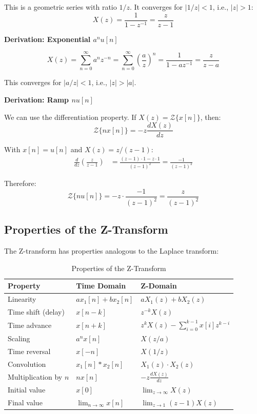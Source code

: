 This is a geometric series with ratio $1/z$. It converges for $|1/z| < 1$, i.e., $|z| > 1$:
\begin{equation}
X(z) = \frac{1}{1 - z^{-1}} = \frac{z}{z-1}
\end{equation}

\textbf{Derivation: Exponential $a^n u[n]$}

\begin{equation}
X(z) = \sum_{n=0}^{\infty} a^n z^{-n} = \sum_{n=0}^{\infty} \left(\frac{a}{z}\right)^n = \frac{1}{1 - az^{-1}} = \frac{z}{z-a}
\end{equation}

This converges for $|a/z| < 1$, i.e., $|z| > |a|$.

\textbf{Derivation: Ramp $n u[n]$}

We can use the differentiation property. If $X(z) = \mathcal{Z}\{x[n]\}$, then:
\begin{equation}
\mathcal{Z}\{n x[n]\} = -z \frac{dX(z)}{dz}
\end{equation}

With $x[n] = u[n]$ and $X(z) = z/(z-1)$:
\begin{align}
\frac{d}{dz}\left(\frac{z}{z-1}\right) &= \frac{(z-1) \cdot 1 - z \cdot 1}{(z-1)^2} = \frac{-1}{(z-1)^2}
\end{align}

Therefore:
\begin{equation}
\mathcal{Z}\{n u[n]\} = -z \cdot \frac{-1}{(z-1)^2} = \frac{z}{(z-1)^2}
\end{equation}

\subsection{Properties of the Z-Transform}

The Z-transform has properties analogous to the Laplace transform:

\begin{table}[htbp]
\centering
\caption{Properties of the Z-Transform}
\label{tab:z_transform_properties}
\begin{tabular}{lll}
\toprule
\textbf{Property} & \textbf{Time Domain} & \textbf{Z-Domain} \\
\midrule
Linearity & $ax_1[n] + bx_2[n]$ & $aX_1(z) + bX_2(z)$ \\[0.3em]
Time shift (delay) & $x[n-k]$ & $z^{-k} X(z)$ \\[0.3em]
Time advance & $x[n+k]$ & $z^k X(z) - \sum_{i=0}^{k-1} x[i] z^{k-i}$ \\[0.3em]
Scaling & $a^n x[n]$ & $X(z/a)$ \\[0.3em]
Time reversal & $x[-n]$ & $X(1/z)$ \\[0.3em]
Convolution & $x_1[n] * x_2[n]$ & $X_1(z) \cdot X_2(z)$ \\[0.3em]
Multiplication by $n$ & $n x[n]$ & $-z \frac{dX(z)}{dz}$ \\[0.3em]
Initial value & $x[0]$ & $\lim_{z \to \infty} X(z)$ \\[0.3em]
Final value & $\lim_{n \to \infty} x[n]$ & $\lim_{z \to 1} (z-1) X(z)$ \\
\bottomrule
\end{tabular}
\end{table}

